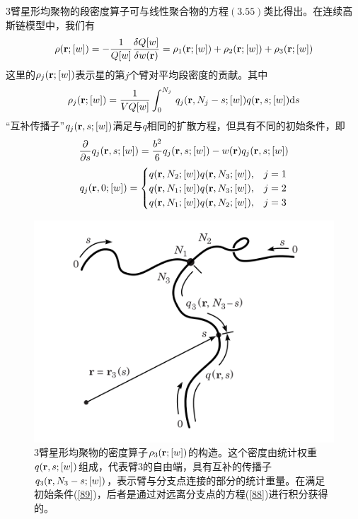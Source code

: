 $3$臂星形均聚物的段密度算子可与线性聚合物的方程$(3.55)$类比得出。在连续高斯链模型中，我们有
\begin{equation}
\rho(\mathbf{r};[w])=-\frac{1}{Q[w]}\frac{\delta Q[w]}{\delta w(\mathbf{r})}=\rho _1(\mathbf{r};[w])+\rho _2(\mathbf{r};[w])+\rho _3(\mathbf{r};[w])
\end{equation}
这里的$\rho _j(\mathbf{r};[w])$表示星的第$j$个臂对平均段密度的贡献。其中
\begin{equation}
\rho _{j}(\mathbf{r};[w])=\frac{1}{VQ[w]} \int_{0}^{N_j}\,q_{j}(\mathbf{r},N_{j}-s;[w])q(\mathbf{r},s;[w]) \mathrm{d}s \label{87}
\end{equation}
“互补传播子”$q_{j}(\mathbf{r},s;[w])$满足与$q$相同的扩散方程，但具有不同的初始条件，即
\begin{equation}
\frac{\partial}{\partial s}q_j(\mathbf{r},s;[w])=\frac{b^2}{6}q_j(\mathbf{r},s;[w])-w(\mathbf{r})q_j(\mathbf{r},s;[w]) \label{88}
\end{equation}
\begin{equation}
q_j(\mathbf{r},0;[w])=
\begin{cases}
q(\mathbf{r},N_2;[w])q(\mathbf{r},N_3;[w]), & j=1 \\
q(\mathbf{r},N_1;[w])q(\mathbf{r},N_3;[w]), & j=2 \\
q(\mathbf{r},N_1;[w])q(\mathbf{r},N_2;[w]), & j=3  \label{89}
\end{cases}
\end{equation}

\begin{figure}[H]
\centering
\includegraphics[scale=0.7]{./figures/35.png}
\caption{$3$臂星形均聚物的密度算子$\rho _3(\mathbf{r};[w])$的构造。这个密度由统计权重$q(\mathbf{r},s;[w])$组成，代表臂$3$的自由端，具有互补的传播子$q_3(\mathbf{r},N_3-s;[w])$，表示臂与分支点连接的部分的统计重量。在满足初始条件(\ref{89})，后者是通过对远离分支点的方程(\ref{88})进行积分获得的。}
\label{三臂星形图像}
\end{figure}

